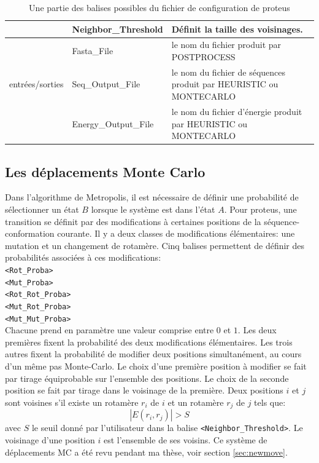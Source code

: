 \begin{table}[!htbp]
\begin{tabular}{|p{0.2\linewidth}|p{0.32\linewidth}|p{0.48\linewidth}|}
                         & Neighbor\_Threshold & Définit la taille des voisinages.\\   \hline
        
                         & Fasta\_File & le nom du fichier produit par POSTPROCESS\\    \cline{2-3}             
        entrées/sorties     & Seq\_Output\_File & le nom  du fichier de séquences produit par HEURISTIC ou MONTECARLO\\    \cline{2-3}             
                         & Energy\_Output\_File & le nom du fichier d'énergie produit par HEURISTIC ou MONTECARLO\\   \hline              

      \end{tabular} 

      \caption{Une partie des balises possibles du fichier de configuration de proteus}      

      \label{tab:balise_proteus}
      

    \end{table}
    

\subsection{Les déplacements Monte Carlo}
\label{sub:MC_move}  
Dans l'algorithme de Metropolis, il est nécessaire de définir une probabilité de sélectionner un état $B$ lorsque le système est dans l'état $A$. Pour proteus, une transition se définit par des modifications à certaines positions de la séquence-conformation courante. Il y a deux classes de modifications élémentaires: une mutation et un changement de rotamère. Cinq balises permettent de définir des probabilités associées à ces modifications: \\
\verb!<Rot_Proba>! \\
\verb!<Mut_Proba>! \\
\verb!<Rot_Rot_Proba>! \\
\verb!<Mut_Rot_Proba>! \\
\verb!<Mut_Mut_Proba>!  \\
Chacune prend en paramètre une valeur comprise entre $0$ et $1$. Les deux premières fixent la probabilité des deux modifications élémentaires. Les trois autres fixent la probabilité de modifier deux positions simultanément, au cours d'un même pas Monte-Carlo. Le choix d'une première position à modifier se fait par tirage équiprobable sur l'ensemble des positions. Le choix de la seconde position se fait par tirage dans le voisinage de la première. Deux positions $i$ et $j$ sont voisines s'il existe un rotamère $r_i$ de $i$ et un rotamère $r_j$ de $j$ tels que:
\begin{displaymath}
  \label{eq:voisin}
 | E(r_i,r_j) | > S
\end{displaymath} 
avec $S$ le seuil donné par l'utilisateur dans la balise \verb!<Neighbor_Threshold>!. Le voisinage d'une position $i$ est l'ensemble de ses voisins. Ce système de déplacements MC a été revu pendant ma thèse, voir section \vref{sec:newmove}.

